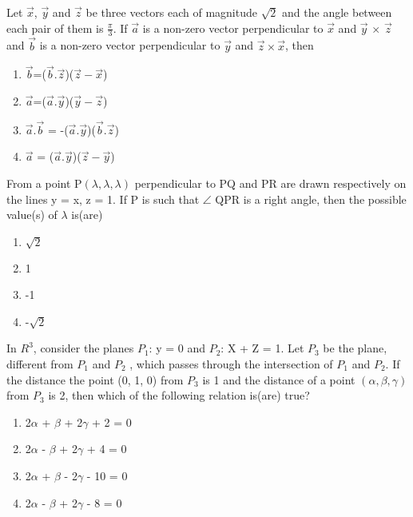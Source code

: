 \item Let $\overrightarrow{x}$, $\overrightarrow{y}$ and $\overrightarrow{z}$ be three vectors each of magnitude 
$\sqrt{2}$ and the angle between each pair of them is $\frac{\pi}{3}$. If $\overrightarrow{a}$ is a non-zero vector perpendicular to $\overrightarrow{x}$ and $\overrightarrow{y}$ $\times$ $\overrightarrow{z}$ and $\overrightarrow{b}$ is a non-zero vector perpendicular to $\overrightarrow{y}$ and $\overrightarrow{z} \times \overrightarrow{x}$, then
\begin{enumerate}
\item $\overrightarrow{b}$=($\overrightarrow{b} . \overrightarrow{z}$)($\overrightarrow{z} - \overrightarrow{x}$)
\item $\overrightarrow{a}$=($\overrightarrow{a} . \overrightarrow{y}$)($\overrightarrow{y} - \overrightarrow{z}$)
\item $\overrightarrow{a}$.$\overrightarrow{b}$ = -($\overrightarrow{a} . \overrightarrow{y}$)($\overrightarrow{b} . \overrightarrow{z}$)
\item $\overrightarrow{a}$ = ($\overrightarrow{a} . \overrightarrow{y}$)($\overrightarrow{z} - \overrightarrow{y}$)
\end{enumerate}

\item From a point P$(\lambda, \lambda, \lambda)$ perpendicular to PQ and PR are drawn respectively on the lines y = x, z = 1. If P is such that $\angle$ QPR is a right angle, then the possible value(s) of $\lambda$ is(are)
\begin{enumerate}
\item $\sqrt{2}$
\item 1
\item -1
\item -$\sqrt{2}$
\end{enumerate} 

\item In $R^{3}$, consider the planes $P_1$: y = 0 and $P_2$: X + Z = 1. Let $P_3$ be the plane, different from $P_1$ and $P_2$ , which passes through the intersection of $P_1$ and $P_2$. If the distance the point (0, 1, 0) from $P_3$ is 1 and the distance of a point $(\alpha, \beta, \gamma)$ from $P_3$ is 2, then which of the following relation is(are) true?
\begin{enumerate}
\item 2$\alpha$ + $\beta$ + 2$\gamma$ + 2 = 0
\item 2$\alpha$ - $\beta$ + 2$\gamma$ + 4 = 0
\item 2$\alpha$ + $\beta$ - 2$\gamma$ - 10 = 0
\item 2$\alpha$ - $\beta$ + 2$\gamma$ - 8 = 0
\end{enumerate} 

